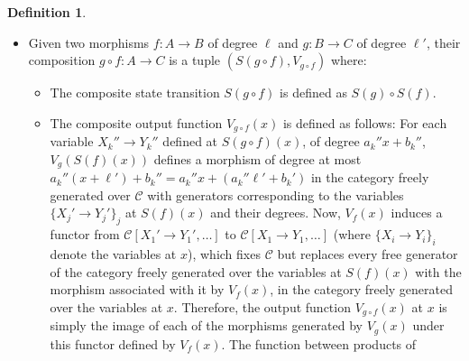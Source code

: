 \documentclass{article}
\theoremstyle{definition}
\newtheorem{definition}{Definition}[section]
\theoremstyle{remark}
\begin{document}
\begin{definition}
\begin{itemize}
\begin{itemize}
        and the degrees of those generators provided by the variables
        $X_i\to Y_i$ of degrees $a_ix+b_i$ in $V_A(x)$. The function
        between hom-sets in $\mathcal{C}$ can then be expressed by
        substituting each generator with a $\mathcal{C}$-morphism of
        the appropriate signature.
        \\ \\
        This induces a function (but not a filtered
        one!) between the product of
        the hom-sets $\mathrm{Hom}_{\mathcal{C}}(X_i,Y_i)$ for all
        variables $X_i\to Y_i$ at $x$ and the product of the hom-sets
        $\mathrm{Hom}_{\mathcal{C}}(X_j',Y_j')$ for all variables
        $X_j'\to Y_j'$ at $S(f)(x)$, which can be obtained by replacing
        each generator corresponding to a variable at $x$ with a 
        morphism of $\mathcal{C}$ of the appropriate signature.
    \end{itemize}
    \item Given two morphisms $f:A\to B$ of degree $\ell$
    and $g:B \to C$ of degree $\ell'$, their composition
    $g\circ f:A\to C$ is a tuple $(S(g\circ f),V_{g \circ f})$ where:
    \begin{itemize}
        \item The composite
        state transition
        $S(g\circ f)$ is defined as $S(g) \circ S(f)$.
        \item The composite output function $V_{g\circ f}(x)$ is
        defined as follows:
        For each variable $X_k''\to Y_k''$ defined at $S(g\circ f)(x)$, of
        degree $a_k''x+b_k''$,
        $V_g(S(f)(x))$ defines a morphism
        of degree at most $a_k''(x+\ell')+b_k''=a_k''x+(a_k''\ell'+b_k')$
        in the category freely generated
        over $\mathcal{C}$ with generators corresponding to the variables
        $\{X_j'\to Y_j'\}_j$
        at $S(f)(x)$ and their degrees. Now, $V_f(x)$ induces a functor
        from $\mathcal{C}[X_1'\to Y_1',\dots]$ to
        $\mathcal{C}[X_1\to Y_1,\dots]$ (where $\{X_i\to Y_i\}_i$ denote
        the variables at $x$), which fixes
        $\mathcal{C}$ but replaces every free generator of the category
        freely generated over the variables at $S(f)(x)$ with the
        morphism associated with it
        by $V_f(x)$,
        in the category freely generated over the variables
        at $x$. Therefore, the output function $V_{g\circ f}(x)$ at
        $x$ is simply the image of each of the morphisms generated
        by $V_g(x)$ under this functor defined by $V_f(x)$. The function
        between products of

\end{itemize}
\end{itemize}
\end{definition}
\end{document}
